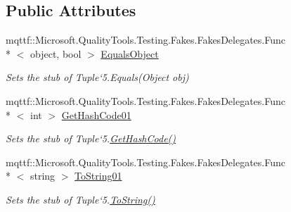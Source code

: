 \subsection*{Public Attributes}
\begin{DoxyCompactItemize}
\item 
mqttf\-::\-Microsoft.\-Quality\-Tools.\-Testing.\-Fakes.\-Fakes\-Delegates.\-Func\\*
$<$ object, bool $>$ \hyperlink{class_system_1_1_fakes_1_1_stub_tuple_3_01_t1_00_01_t2_00_01_t3_00_01_t4_00_01_t5_01_4_a1dc3ae7f98851cea2f5c55bf7e18b4af}{Equals\-Object}
\begin{DoxyCompactList}\small\item\em Sets the stub of Tuple`5.Equals(\-Object obj)\end{DoxyCompactList}\item 
mqttf\-::\-Microsoft.\-Quality\-Tools.\-Testing.\-Fakes.\-Fakes\-Delegates.\-Func\\*
$<$ int $>$ \hyperlink{class_system_1_1_fakes_1_1_stub_tuple_3_01_t1_00_01_t2_00_01_t3_00_01_t4_00_01_t5_01_4_abcfd5741ef89f3a26c667fb032f5bb99}{Get\-Hash\-Code01}
\begin{DoxyCompactList}\small\item\em Sets the stub of Tuple`5.\hyperlink{class_system_1_1_fakes_1_1_stub_tuple_3_01_t1_00_01_t2_00_01_t3_00_01_t4_00_01_t5_01_4_a7ea8128580a3e411c8aaf986c04e2549}{Get\-Hash\-Code()}\end{DoxyCompactList}\item 
mqttf\-::\-Microsoft.\-Quality\-Tools.\-Testing.\-Fakes.\-Fakes\-Delegates.\-Func\\*
$<$ string $>$ \hyperlink{class_system_1_1_fakes_1_1_stub_tuple_3_01_t1_00_01_t2_00_01_t3_00_01_t4_00_01_t5_01_4_a831923e2bf4f586e518df4119566ffbf}{To\-String01}
\begin{DoxyCompactList}\small\item\em Sets the stub of Tuple`5.\hyperlink{class_system_1_1_fakes_1_1_stub_tuple_3_01_t1_00_01_t2_00_01_t3_00_01_t4_00_01_t5_01_4_a7409cdfc9619fcf7bb19cabde917332d}{To\-String()}\end{DoxyCompactList}\end{DoxyCompactItemize}
